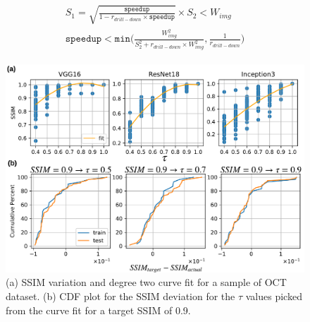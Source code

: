 \begin{align}
\label{eqn:speedup_bound}
\begin{split}
S_1 = \sqrt{\frac{\texttt{speedup}}{1 - r_{drill-down} \times \texttt{speedup}}} \times S_2 < W_{img}\\
\texttt{speedup} < \texttt{min}\Bigg(\frac{W^2_{img}}{S^2_2+r_{drill-down}\times W^2_{img}}, \frac{1}{r_{drill-down}}\Bigg)
\end{split}
\end{align}


\begin{figure}[t]
\includegraphics[width=\columnwidth]{images/system_tuning}
\caption{(a) SSIM variation and degree two curve fit for a sample of OCT dataset. (b) CDF plot for the SSIM deviation for the $\tau$ values picked from the curve fit for a target SSIM of 0.9.}
\label{fig:system_tuning}
\end{figure}


